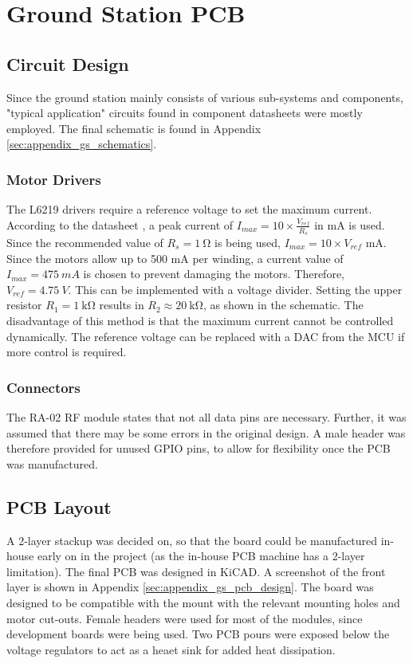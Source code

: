 \graphicspath{{./figures}}

\section{Ground Station PCB}
\subsection{Circuit Design}
Since the ground station mainly consists of various sub-systems and components, "typical application" circuits found in component datasheets were mostly employed. The final schematic is found in Appendix \ref{sec:appendix_gs_schematics}.

\subsubsection{Motor Drivers}
The L6219 drivers require a reference voltage to set the maximum current. According to the datasheet \cite{datasheet-L6219}, a peak current of $I_{max} = 10 \times \frac{V_{ref}}{R_s}$ in mA is used. Since the recommended value of $R_s = \SI{1}{\ohm}$ is being used, $I_{max} = 10 \times V_{ref}$ mA. Since the motors allow up to 500 mA per winding, a current value of $I_{max} = \SI{475}{mA}$ is chosen to prevent damaging the motors. Therefore, $V_{ref} = \SI{4.75}{V}$. This can be implemented with a voltage divider. Setting the upper resistor $R_1 = \SI{1}{\kilo \ohm}$ results in $R_2 \approx \SI{20}{\kilo \ohm}$, as shown in the schematic. The disadvantage of this method is that the maximum current cannot be controlled dynamically. The reference voltage can be replaced with a DAC from the MCU if more control is required.

\subsubsection{Connectors}
The RA-02 RF module states that not all data pins are necessary. Further, it was assumed that there may be some errors in the original design. A male header was therefore provided for unused GPIO pins, to allow for flexibility once the PCB was manufactured.

\subsection{PCB Layout}
A 2-layer stackup was decided on, so that the board could be manufactured in-house early on in the project (as the in-house PCB machine has a 2-layer limitation). The final PCB was designed in KiCAD. A screenshot of the front layer is shown in Appendix \ref{sec:appendix_gs_pcb_design}. The board was designed to be compatible with the mount with the relevant mounting holes and motor cut-outs. Female headers were used for most of the modules, since development boards were being used. Two PCB pours were exposed below the voltage regulators to act as a heaet sink for added heat dissipation.